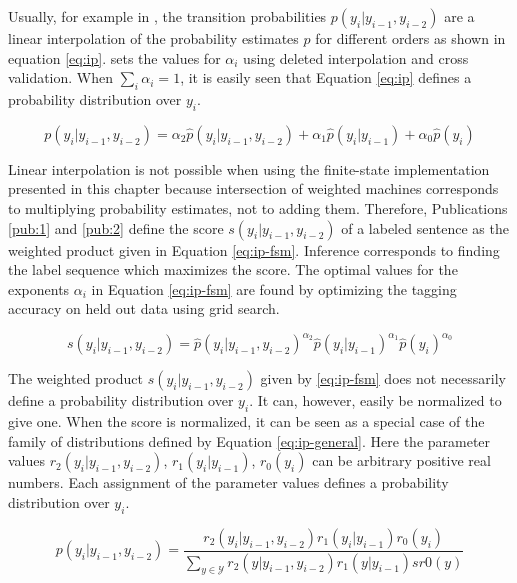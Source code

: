Usually, for example in \cite{Brants2000}, the transition
probabilities $p(y_i|y_{i-1}, y_{i-2})$ are a linear interpolation of
the probability estimates $\hat{p}$ for different orders as shown in
equation \ref{eq:ip}. \cite{Brants2000} sets the values for $\alpha_i$
using deleted interpolation and cross validation. When $\sum_i
\alpha_i = 1$, it is easily seen that Equation \ref{eq:ip} defines a
probability distribution over $y_i$.

\begin{equation}
p(y_i|y_{i-1}, y_{i-2}) = \alpha_2\hat{p}(y_i|y_{i-1},y_{i-2}) + \alpha_1\hat{p}(y_i|y_{i-1}) + \alpha_0\hat{p}(y_i)\label{eq:ip}
\end{equation}

Linear interpolation is not possible when using the finite-state
implementation presented in this chapter because intersection of
weighted machines corresponds to multiplying probability estimates,
not to adding them. Therefore, Publications \ref{pub:1} and
\ref{pub:2} define the score $s(y_i|y_{i-1}, y_{i-2})$ of a labeled
sentence as the weighted product given in Equation
\ref{eq:ip-fsm}. Inference corresponds to finding the label sequence
which maximizes the score. The optimal values for the exponents
$\alpha_i$ in Equation \ref{eq:ip-fsm} are found by optimizing the
tagging accuracy on held out data using grid search.

\begin{equation}
s(y_i|y_{i-1}, y_{i-2}) = \hat{p}(y_i|y_{i-1},y_{i-2})^{\alpha_2} \hat{p}(y_i|y_{i-1})^{\alpha_1}\hat{p}(y_i)^{\alpha_0}\label{eq:ip-fsm}
\end{equation}

The weighted product $s(y_i|y_{i-1}, y_{i-2})$ given by
\ref{eq:ip-fsm} does not necessarily define a probability distribution
over $y_i$. It can, however, easily be normalized to give one. When the
score is normalized, it can be seen as a special case of the family of
distributions defined by Equation \ref{eq:ip-general}. Here the
parameter values $r_2(y_i|y_{i-1},y_{i-2})$, $r_1(y_i|y_{i-1})$,
$r_0(y_i)$ can be arbitrary positive real numbers. Each assignment of
the parameter values defines a probability distribution over $y_i$.

\begin{equation}
p(y_i|y_{i-1}, y_{i-2}) = \frac{r_2(y_i|y_{i-1},y_{i-2})r_1(y_i|y_{i-1})r_0(y_i)}{\sum_{y\in\mathcal{Y}} r_2(y|y_{i-1},y_{i-2})r_1(y|y_{i-1})sr0(y)}\label{eq:ip-general}
\end{equation}

